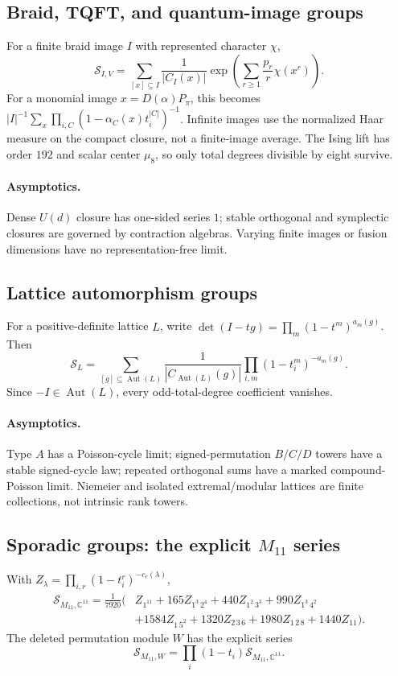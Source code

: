 \documentclass[10pt]{article}
\newcommand{\MGF}{\mathcal S}
\newcommand{\C}{\mathbb C}
\newcommand{\Aut}{\operatorname{Aut}}
\begin{document}
\subsection{Braid, TQFT, and quantum-image groups}
For a finite braid image $I$ with represented character $\chi$,
\[
 \boxed{\MGF_{I,V}=\sum_{[x]\subseteq I}\frac1{|C_I(x)|}
 \exp\!\left(\sum_{r\ge1}\frac{p_r}{r}\chi(x^r)\right).}
\]
For a monomial image $x=D(\alpha)P_\pi$, this becomes
$|I|^{-1}\sum_x\prod_{i,C}(1-\alpha_C(x)t_i^{|C|})^{-1}$.
Infinite images use the normalized Haar measure on the compact closure, not a
finite-image average.  The Ising lift has order $192$ and scalar center
$\mu_8$, so only total degrees divisible by eight survive.
\paragraph{Asymptotics.}
Dense $U(d)$ closure has one-sided series $1$; stable orthogonal and
symplectic closures are governed by contraction algebras.  Varying finite
images or fusion dimensions have no representation-free limit.

\subsection{Lattice automorphism groups}
For a positive-definite lattice $L$, write
$\det(I-tg)=\prod_m(1-t^m)^{a_m(g)}$.  Then
\begin{equation}\label{eq:new-lattice}
 \boxed{\MGF_L=\sum_{[g]\subseteq\Aut(L)}\frac1{|C_{\Aut(L)}(g)|}
 \prod_{i,m}(1-t_i^m)^{-a_m(g)}.}
\end{equation}
Since $-I\in\Aut(L)$, every odd-total-degree coefficient vanishes.
\paragraph{Asymptotics.}
Type $A$ has a Poisson-cycle limit; signed-permutation $B/C/D$ towers have a
stable signed-cycle law; repeated orthogonal sums have a marked
compound-Poisson limit.  Niemeier and isolated extremal/modular lattices are
finite collections, not intrinsic rank towers.

\subsection{Sporadic groups: the explicit $M_{11}$ series}
With $Z_\lambda=\prod_{i,r}(1-t_i^r)^{-c_r(\lambda)}$,
\[
 \boxed{\begin{aligned}
 \MGF_{M_{11},\C^{11}}=\frac1{7920}\big(&Z_{1^{11}}
 +165Z_{1^3\,2^4}+440Z_{1^2\,3^3}+990Z_{1^3\,4^2}\\
 &+1584Z_{1\,5^2}+1320Z_{2\,3\,6}
 +1980Z_{1\,2\,8}+1440Z_{11}\big).
 \end{aligned}}
\]
The deleted permutation module $W$ has the explicit series
\[
 \MGF_{M_{11},W}=\prod_i(1-t_i)\MGF_{M_{11},\C^{11}}.
\]
\end{document}
